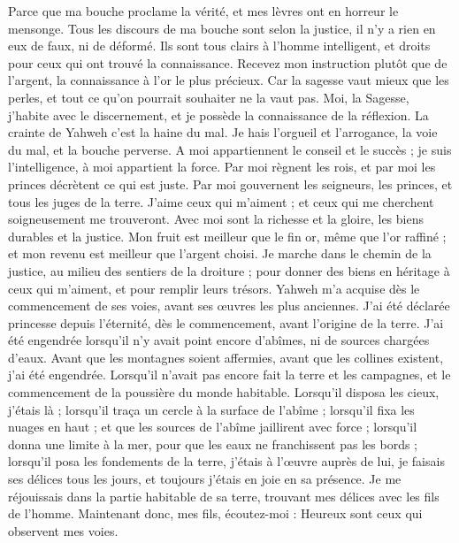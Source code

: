 \begin{multicols}{2}
Parce que ma bouche proclame la vérité, et mes lèvres ont en horreur le mensonge.
Tous les discours de ma bouche sont selon la justice, il n'y a rien en eux de faux, ni de déformé.
Ils sont tous clairs à l'homme intelligent, et droits pour ceux qui ont trouvé la connaissance.
Recevez mon instruction plutôt que de l'argent, la connaissance à l’or le plus précieux.
Car la sagesse vaut mieux que les perles, et tout ce qu’on pourrait souhaiter ne la vaut pas.
Moi, la Sagesse, j'habite avec le discernement, et je possède la connaissance de la réflexion.
La crainte de Yahweh c'est la haine du mal. Je hais l'orgueil et l'arrogance, la voie du mal, et la bouche perverse.
A moi appartiennent le conseil et le succès ; je suis l’intelligence, à moi appartient la force.
Par moi règnent les rois, et par moi les princes décrètent ce qui est juste.
Par moi gouvernent les seigneurs, les princes, et tous les juges de la terre.
J'aime ceux qui m'aiment ; et ceux qui me cherchent soigneusement me trouveront.
Avec moi sont la richesse et la gloire, les biens durables et la justice.
Mon fruit est meilleur que le fin or, même que l'or raffiné ; et mon revenu est meilleur que l’argent choisi.
Je marche dans le chemin de la justice, au milieu des sentiers de la droiture ;
pour donner des biens en héritage à ceux qui m'aiment, et pour remplir leurs trésors.
Yahweh m'a acquise dès le commencement de ses voies, avant ses œuvres les plus anciennes.
J'ai été déclarée princesse depuis l’éternité, dès le commencement, avant l’origine de la terre.
J'ai été engendrée lorsqu'il n'y avait point encore d'abîmes, ni de sources chargées d'eaux.
Avant que les montagnes soient affermies, avant que les collines existent, j’ai été engendrée.
Lorsqu'il n'avait pas encore fait la terre et les campagnes, et le commencement de la poussière du monde habitable.
Lorsqu’il disposa les cieux, j’étais là ; lorsqu’il traça un cercle à la surface de l’abîme ;
lorsqu’il fixa les nuages en haut ; et que les sources de l’abîme jaillirent avec force ;
lorsqu’il donna une limite à la mer, pour que les eaux ne franchissent pas les bords ; lorsqu’il posa les fondements de la terre,
j’étais à l’œuvre auprès de lui, je faisais ses délices tous les jours, et toujours j'étais en joie en sa présence.
Je me réjouissais dans la partie habitable de sa terre, trouvant mes délices avec les fils de l’homme.
Maintenant donc, mes fils, écoutez-moi : Heureux sont ceux qui observent mes voies.

\end{multicols}
